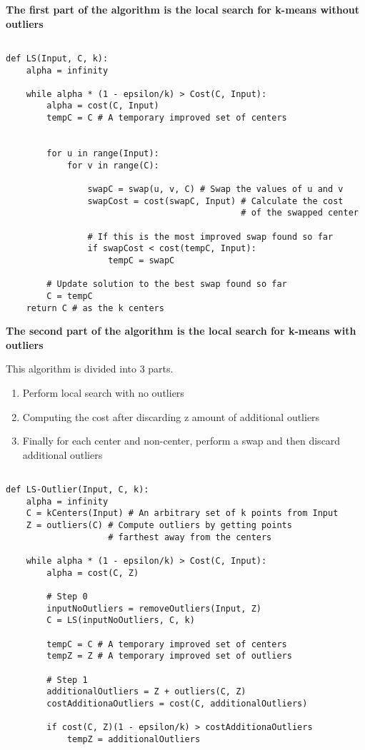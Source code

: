 \documentclass[11pt]{article}
\begin{document}
{\break}

{\bf The first part of the algorithm is the local search for k-means without outliers}

\begin{lstlisting}

def LS(Input, C, k):
    alpha = infinity

    while alpha * (1 - epsilon/k) > Cost(C, Input):
        alpha = cost(C, Input)
        tempC = C # A temporary improved set of centers


        for u in range(Input):
            for v in range(C):

                swapC = swap(u, v, C) # Swap the values of u and v
                swapCost = cost(swapC, Input) # Calculate the cost
                                              # of the swapped center

                # If this is the most improved swap found so far
                if swapCost < cost(tempC, Input):
                    tempC = swapC

        # Update solution to the best swap found so far
        C = tempC
    return C # as the k centers
\end{lstlisting}

{\bf The second part of the algorithm is the local search for k-means with outliers}

This algorithm is divided into 3 parts.

\begin{enumerate}

\item Perform local search with no outliers

\item Computing the cost after discarding z amount of additional outliers

\item  Finally for each center and non-center, perform a swap and then discard additional outliers

\end{enumerate}


\begin{lstlisting}

def LS-Outlier(Input, C, k):
    alpha = infinity
    C = kCenters(Input) # An arbitrary set of k points from Input
    Z = outliers(C) # Compute outliers by getting points
                    # farthest away from the centers

    while alpha * (1 - epsilon/k) > Cost(C, Input):
        alpha = cost(C, Z)

        # Step 0
        inputNoOutliers = removeOutliers(Input, Z)
        C = LS(inputNoOutliers, C, k)

        tempC = C # A temporary improved set of centers
        tempZ = Z # A temporary improved set of outliers

        # Step 1
        additionalOutliers = Z + outliers(C, Z)
        costAdditionaOutliers = cost(C, additionalOutliers)

        if cost(C, Z)(1 - epsilon/k) > costAdditionaOutliers
            tempZ = additionalOutliers

\end{lstlisting}
\end{document}
